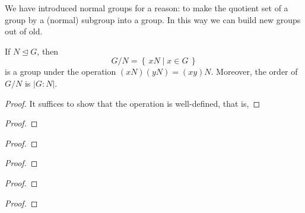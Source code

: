 \documentclass[11pt,a4paper]{article}
\begin{document}
We have introduced normal groups for a reason: to make the quotient set of a group by a (normal) subgroup into a group.
In this way we can build new groups out of old.

\begin{teo}
    If \(N\unlhd G\), then 
    \[G/N = \left\{ \,xN \mid x \in G \,\right\}\]
    is a group under the operation \((xN)(yN) = (xy) N\).
    Moreover, the order of \(G/N\) is \(|G: N|\).
\end{teo}

\begin{proof}
It suffices to show that the operation is well-defined, that is, 

\end{proof}

\begin{teo}
    
\end{teo}


\begin{proof}
    
\end{proof}


\begin{rem}
    
\end{rem}

\begin{teo}
    
\end{teo}

\begin{proof}
    
\end{proof}


\begin{teo}
    
\end{teo}


\begin{proof}
    
\end{proof}

\begin{cor}
    
\end{cor}

\begin{proof}
    
\end{proof}

\begin{cor}
    
\end{cor}

\begin{proof}
    
\end{proof}
\end{document}
